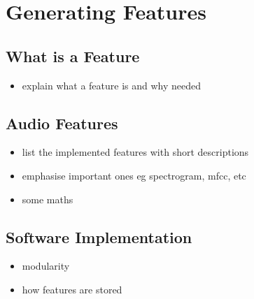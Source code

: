\section{Generating Features}
\label{sec:pl-feats}
    \subsection{What is a Feature}
    \label{subsec:pl-feats-feat}
        \begin{itemize}
            \item{explain what a feature is and why needed}
        \end{itemize}
        
    \subsection{Audio Features}
    \label{subsec:pl-feats-audio}
        \begin{itemize}
            \item{list the implemented features with short descriptions}
            \item{emphasise important ones eg spectrogram, mfcc, etc}
            \item{some maths}
        \end{itemize}
        
    \subsection{Software Implementation}
    \label{subsec:pl-feats-software}
        \begin{itemize}
            \item{modularity}
            \item{how features are stored}
        \end{itemize}
        
  